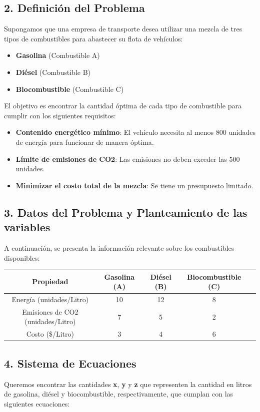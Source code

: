 \documentclass[]{article}
\begin{document}
	\subsection*{2. Definición del Problema}
	Supongamos que una empresa de transporte desea utilizar una mezcla de tres tipos de combustibles para abastecer su flota de vehículos:
	
	\begin{itemize}
		\item \textbf{Gasolina} (Combustible A)
		\item \textbf{Diésel} (Combustible B)
		\item \textbf{Biocombustible} (Combustible C)
	\end{itemize}
	
	El objetivo es encontrar la cantidad óptima de cada tipo de combustible para cumplir con los siguientes requisitos:
	\begin{itemize}
		\item \textbf{Contenido energético mínimo}: El vehículo necesita al menos 800 unidades de energía para funcionar de manera óptima.
		\item \textbf{Límite de emisiones de CO2}: Las emisiones no deben exceder las 500 unidades.
		\item \textbf{Minimizar el costo total de la mezcla}: Se tiene un presupuesto limitado.
	\end{itemize}
	
	\subsection*{3. Datos del Problema y Planteamiento de las variables}
	A continuación, se presenta la información relevante sobre los combustibles disponibles:
	
	\begin{center}
		\begin{tabular}{|c|c|c|c|c|}
			\hline
			Propiedad & Gasolina (A) & Diésel (B) & Biocombustible (C) \\
			\hline
			Energía (unidades/Litro) & 10 & 12 & 8 \\
			\hline
			Emisiones de CO2 (unidades/Litro) & 7 & 5 & 2 \\
			\hline
			Costo (\$/Litro) & 3 & 4 & 6 \\
			\hline
		\end{tabular}
	\end{center}
	
	\subsection*{4. Sistema de Ecuaciones}
	Queremos encontrar las cantidades \textbf{x}, \textbf{y} y \textbf{z} que representen la cantidad en litros de gasolina, diésel y biocombustible, respectivamente, que cumplan con las siguientes ecuaciones:
	
\end{document}
